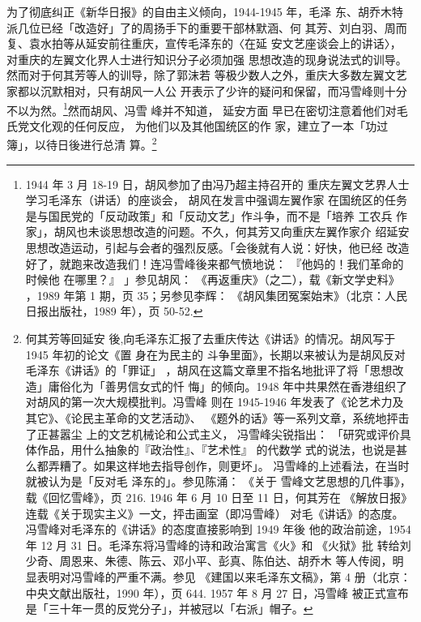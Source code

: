 为了彻底纠正《新华日报》的自由主义倾向，1944-1945 年，毛泽 东、胡乔木特
派几位已经「改造好」了的周扬手下的重要干部林默涵、何 其芳、刘白羽、周而
复、袁水拍等从延安前往重庆，宣传毛泽东的〈在延 安文艺座谈会上的讲话〉，
对重庆的左翼文化界人士进行知识分子必须加强 思想改造的现身说法式的训导。
然而对于何其芳等人的训导，除了郭沫若 等极少数人之外，重庆大多数左翼文艺
家都以沉默相对，只有胡风一人公 开表示了少许的疑问和保留，而冯雪峰则十分
不以为然。\footnote{ 1944 年 3 月 18-19 日，胡风参加了由冯乃超主持召开的
重庆左翼文艺界人士学习毛泽东（讲话）的座谈会， 胡风在发言中强调左翼作家
在国统区的任务是与国民党的「反动政策」和「反动文艺」作斗争，而不是「培养
工农兵 作家」，胡风也未谈思想改造的问题。不久，何其芳又向重庆左翼作家介
绍延安思想改造运动，引起与会者的强烈反感。「会後就有人说：好快，他已经
改造好了，就跑来改造我们！连冯雪峰後来都气愤地说： 『他妈的！我们革命的
时候他 在哪里？』 」参见胡风： 《再返重庆》（之二），载《新文学史料》
，1989 年第 1 期，页 35；另参见李辉： 《胡风集团冤案始末》（北京：人民
日报出版社，1989 年），页 50-52.  }然而胡风、冯雪 峰并不知道， 延安方面
早已在密切注意着他们对毛氏党文化观的任何反应， 为他们以及其他国统区的作
家，建立了一本「功过簿」，以待日後进行总清 算。\footnote{何其芳等回延安
後,向毛泽东汇报了去重庆传达《讲话》的情况。胡风写于 1945 年初的论文《置
身在为民主的 斗争里面》，长期以来被认为是胡风反对毛泽东《讲话》的「罪证」
，胡风在这篇文章里不指名地批评了将「思想改造」庸俗化为「善男信女式的忏
悔」的倾向。1948 年中共果然在香港组织了对胡风的第一次大规模批判。冯雪峰
则在 1945-1946 年发表了《论艺术力及其它》、《论民主革命的文艺活动》、
《题外的话》等一系列文章，系统地抨击了正甚嚣尘 上的文艺机械论和公式主义，
冯雪峰尖锐指出： 「研究或评价具体作品，用什么抽象的『政治性』、『艺术性』
的代数学 式的说法，也说是甚么都弄糟了。如果这样地去指导创作，则更坏」。
冯雪峰的上述看法，在当时就被认为是「反对毛 泽东的」。参见陈涌： 《关于
雪峰文艺思想的几件事》，载《回忆雪峰》，页 216. 1946 年 6 月 10 日至
11 日，何其芳在 《解放日报》连载《关于现实主义》一文，抨击画室（即冯雪峰）
对毛《讲话》的态度。冯雪峰对毛泽东的《讲话》的态度直接影响到 1949 年後
他的政治前途，1954 年 12 月 31 日。毛泽东将冯雪峰的诗和政治寓言《火》和
《火狱》批 转给刘少奇、周恩来、朱德、陈云、邓小平、彭真、陈伯达、胡乔木
等人传阅，明显表明对冯雪峰的严重不满。参见 《建国以来毛泽东文稿》，第 4
册（北京：中央文献出版社，1990 年），页 644. 1957 年 8 月 27 日，冯雪峰
被正式宣布 是「三十年一贯的反党分子」，并被冠以「右派」帽子。}

